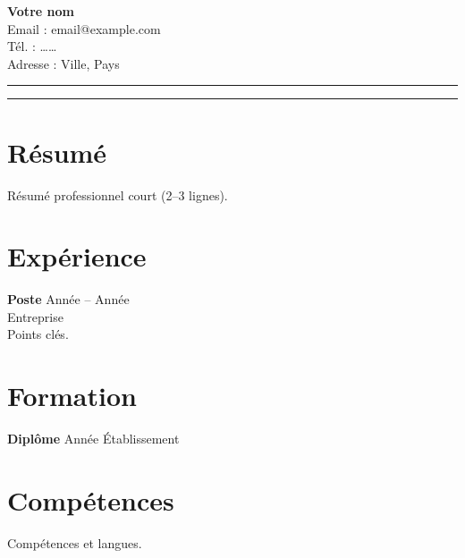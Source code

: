 \documentclass[11pt,a4paper]{article}
\begin{document}
\begin{minipage}[t]{0.72\textwidth}
\vspace{0pt}
{\LARGE \textbf{Votre nom}}\\[0.25em]
Email : email@example.com \\
Tél. : …… \\
Adresse : Ville, Pays
\end{minipage}
\begin{minipage}[t]{0.25\textwidth}
\vspace{0pt}
\raggedleft
\rule{2.8cm}{3.2cm}
\end{minipage}
\vspace{0.5em}
\noindent\rule{\textwidth}{0.4pt}
\section*{Résumé}
Résumé professionnel court (2--3 lignes).
\section*{Expérience}
\textbf{Poste} \hfill Année -- Année \\
Entreprise \\
Points clés.
\section*{Formation}
\textbf{Diplôme} \hfill Année \quad Établissement
\section*{Compétences}
Compétences et langues.
\end{document}
